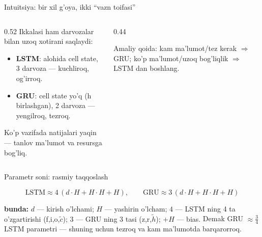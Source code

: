 \documentclass[aspectratio=169,11pt]{beamer}
\newcommand{\bunda}[1]{{\small\textbf{bunda:}\; #1}}
\begin{document}
\begin{frame}{Intuitsiya: bir xil g'oya, ikki ``vazn toifasi''}
  \begin{columns}[T]
    \begin{column}{0.52\textwidth}
      \small
      Ikkalasi ham darvozalar bilan uzoq xotirani saqlaydi:
      \begin{itemize}\setlength\itemsep{1pt}
        \item \textbf{LSTM}: alohida cell state, 3 darvoza --- kuchliroq, og'irroq.
        \item \textbf{GRU}: cell state yo'q (h birlashgan), 2 darvoza --- yengilroq, tezroq.
      \end{itemize}
      \vspace{4pt}
      Ko'p vazifada natijalari yaqin --- tanlov ma'lumot va resursga bog'liq.
    \end{column}
    \begin{column}{0.44\textwidth}
      \begin{tcolorbox}[okbox,top=2pt,bottom=2pt]
        \footnotesize
        Amaliy qoida: kam ma'lumot/tez kerak $\Rightarrow$ GRU; ko'p ma'lumot/uzoq
        bog'liqlik $\Rightarrow$ LSTM dan boshlang.
      \end{tcolorbox}
    \end{column}
  \end{columns}
\end{frame}

\begin{frame}{Parametr soni: rasmiy taqqoslash}
  \begin{tcolorbox}[defbox,title=Ta'rif: gated RNN parametrlari soni]
    \vspace{-0.4em}
    $$ \text{LSTM} \approx 4\,(d{\cdot}H + H{\cdot}H + H), \qquad
       \text{GRU} \approx 3\,(d{\cdot}H + H{\cdot}H + H) $$
  \end{tcolorbox}
  \vspace{2pt}
  \bunda{$d$ --- kirish o'lchami; $H$ --- yashirin o'lcham; $4$ --- LSTM ning
  4 ta o'zgartirishi (f,i,o,$\tilde{c}$); $3$ --- GRU ning 3 tasi (z,r,$\tilde{h}$);
  $+H$ --- bias.}
  \vspace{4pt}
  \footnotesize Demak GRU $\approx \tfrac{3}{4}$ LSTM parametri --- shuning uchun
  tezroq va kam ma'lumotda barqarorroq.
\end{frame}
\end{document}
